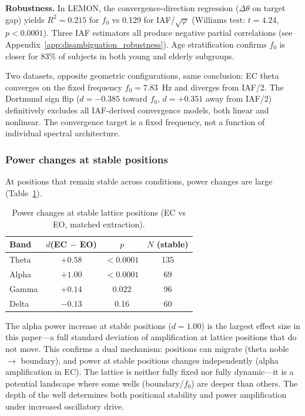 \documentclass[11pt,a4paper]{article}
\newcommand{\phisym}{\varphi}
\newcommand{\fzero}{f_0}
\begin{document}
\textbf{Robustness.} In LEMON, the convergence-direction regression ($\Delta\theta$ on target gap) yields $R^2 = 0.215$ for $\fzero$ vs 0.129 for IAF/$\sqrt{\phisym}$ (Williams test: $t = 4.24$, $p < 0.0001$). Three IAF estimators all produce negative partial correlations (see Appendix~\ref{app:disambiguation_robustness}). Age stratification confirms $\fzero$ is closer for 83\% of subjects in both young and elderly subgroups.

\begin{keyinsight}
Two datasets, opposite geometric configurations, same conclusion: EC theta converges on the fixed frequency $\fzero = 7.83$~Hz and diverges from IAF/2. The Dortmund sign flip ($d = -0.385$ toward $\fzero$, $d = +0.351$ away from IAF/2) definitively excludes all IAF-derived convergence models, both linear and nonlinear. The convergence target is a fixed frequency, not a function of individual spectral architecture.
\end{keyinsight}

\subsubsection{Power changes at stable positions}

At positions that remain stable across conditions, power changes are large (Table~\ref{tab:power_change}).

\begin{table}[H]
\centering
\caption{Power changes at stable lattice positions (EC vs EO, matched extraction).}
\label{tab:power_change}
\begin{tabular}{lccc}
\toprule
Band & $d$(EC $-$ EO) & $p$ & $N$ (stable) \\
\midrule
Theta & $+0.58$ & $<0.0001$ & 135 \\
Alpha & $+1.00$ & $<0.0001$ & 69 \\
Gamma & $+0.14$ & 0.022 & 96 \\
Delta & $-0.13$ & 0.16 & 60 \\
\bottomrule
\end{tabular}
\end{table}

The alpha power increase at stable positions ($d = 1.00$) is the largest effect size in this paper---a full standard deviation of amplification at lattice positions that do not move. This confirms a dual mechanism: positions can migrate (theta noble $\to$ boundary), and power at stable positions changes independently (alpha amplification in EC). The lattice is neither fully fixed nor fully dynamic---it is a potential landscape where some wells (boundary/$\fzero$) are deeper than others. The depth of the well determines both positional stability and power amplification under increased oscillatory drive.
\end{document}
